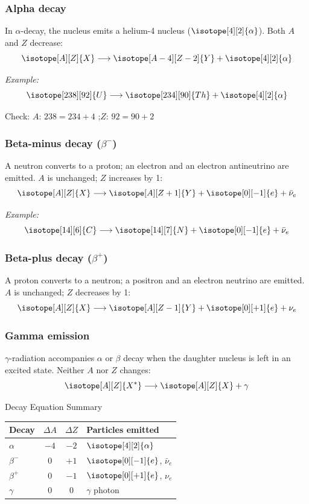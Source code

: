 \subsubsection*{Alpha decay}

In $\alpha$-decay, the nucleus emits a helium-4 nucleus ($\isotope[4][2]{\alpha}$). Both $A$ and $Z$ decrease:
$$\isotope[A][Z]{X} \longrightarrow \isotope[A-4][Z-2]{Y} + \isotope[4][2]{\alpha}$$

\textit{Example:}
$$\isotope[238][92]{U} \longrightarrow \isotope[234][90]{Th} + \isotope[4][2]{\alpha}$$

Check: $A$: $238 = 234 + 4$ \checkmark;\quad $Z$: $92 = 90 + 2$ \checkmark

\subsubsection*{Beta-minus decay ($\beta^-$)}

A neutron converts to a proton; an electron and an electron antineutrino are emitted. $A$ is unchanged; $Z$ increases by 1:
$$\isotope[A][Z]{X} \longrightarrow \isotope[A][Z+1]{Y} + \isotope[0][-1]{e} + \bar{\nu}_e$$

\textit{Example:}
$$\isotope[14][6]{C} \longrightarrow \isotope[14][7]{N} + \isotope[0][-1]{e} + \bar{\nu}_e$$

\subsubsection*{Beta-plus decay ($\beta^+$)}

A proton converts to a neutron; a positron and an electron neutrino are emitted. $A$ is unchanged; $Z$ decreases by 1:
$$\isotope[A][Z]{X} \longrightarrow \isotope[A][Z-1]{Y} + \isotope[0][+1]{e} + \nu_e$$

\subsubsection*{Gamma emission}

$\gamma$-radiation accompanies $\alpha$ or $\beta$ decay when the daughter nucleus is left in an excited state. Neither $A$ nor $Z$ changes:
$$\isotope[A][Z]{X^*} \longrightarrow \isotope[A][Z]{X} + \gamma$$

\begin{formulabox}{Decay Equation Summary}
\begin{center}
\renewcommand{\arraystretch}{1.4}
\begin{tabular}{@{} l c c l @{}}
\toprule
\textbf{Decay} & $\Delta A$ & $\Delta Z$ & \textbf{Particles emitted} \\
\midrule
$\alpha$ & $-4$ & $-2$ & $\isotope[4][2]{\alpha}$ \\
$\beta^-$ & $0$ & $+1$ & $\isotope[0][-1]{e}$, $\bar{\nu}_e$ \\
$\beta^+$ & $0$ & $-1$ & $\isotope[0][+1]{e}$, $\nu_e$ \\
$\gamma$ & $0$ & $0$ & $\gamma$ photon \\
\bottomrule
\end{tabular}
\end{center}
\end{formulabox}

